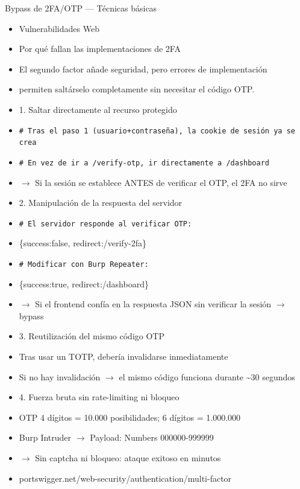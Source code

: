 \documentclass[aspectratio=169,10pt]{beamer}
\newcommand{\cmd}[1]{\texttt{\color{uznavy}#1}}
\begin{document}
\begin{frame}[allowframebreaks]{Bypass de 2FA/OTP --- Técnicas básicas}
\small
  \begin{itemize}
  \item Vulnerabilidades Web
  \item Por qué fallan las implementaciones de 2FA
  \item El segundo factor añade seguridad, pero errores de implementación
  \item permiten saltárselo completamente sin necesitar el código OTP.
  \item 1. Saltar directamente al recurso protegido
  \item \cmd{\# Tras el paso 1 (usuario+contraseña), la cookie de sesión ya se crea}
  \item \cmd{\# En vez de ir a /verify-otp, ir directamente a /dashboard}
  \item $\rightarrow$ Si la sesión se establece ANTES de verificar el OTP, el 2FA no sirve
  \item 2. Manipulación de la respuesta del servidor
  \item \cmd{\# El servidor responde al verificar OTP:}
  \item \{\textquotedbl{}success\textquotedbl{}:false, \textquotedbl{}redirect\textquotedbl{}:\textquotedbl{}/verify-2fa\textquotedbl{}\}
  \item \cmd{\# Modificar con Burp Repeater:}
  \item \{\textquotedbl{}success\textquotedbl{}:true, \textquotedbl{}redirect\textquotedbl{}:\textquotedbl{}/dashboard\textquotedbl{}\}
  \item $\rightarrow$ Si el frontend confía en la respuesta JSON sin verificar la sesión $\rightarrow$ bypass
  \item 3. Reutilización del mismo código OTP
  \item Tras usar un TOTP, debería invalidarse inmediatamente
  \item Si no hay invalidación $\rightarrow$ el mismo código funciona durante \textasciitilde{}30 segundos
  \item 4. Fuerza bruta sin rate-limiting ni bloqueo
  \item OTP 4 dígitos = 10.000 posibilidades; 6 dígitos = 1.000.000
  \item Burp Intruder $\rightarrow$ Payload: Numbers 000000-999999
  \item $\rightarrow$ Sin captcha ni bloqueo: ataque exitoso en minutos
  \item portswigger.net/web-security/authentication/multi-factor
  \end{itemize}
\end{frame}
\end{document}
